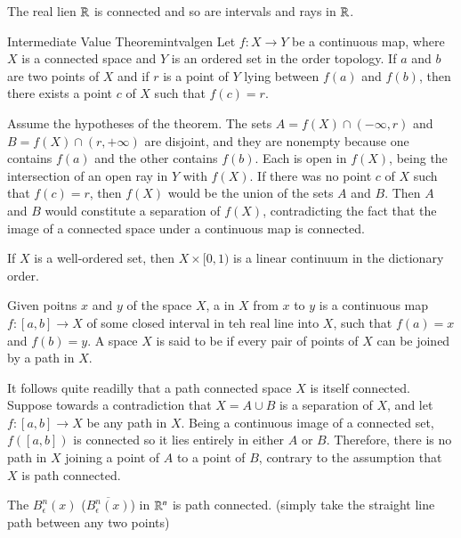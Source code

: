 \documentclass[12pt, a4paper, twoside, openright, titlepage]{book}
\begin{document}
\begin{cor}{}{}
    The real lien $\mathbb R$ is connected and so are intervals and rays in $\mathbb R$.
\end{cor}


\begin{namthm}{Intermediate Value Theorem}{intvalgen}
    Let $f:X\rightarrow Y$ be a continuous map, where $X$ is a connected space and $Y$ is an ordered set in the order topology. If $a$ and $b$ are two points of $X$ and if $r$ is a point of $Y$ lying between $f(a)$ and $f(b)$, then there exists a point $c$ of $X$ such that $f(c) = r$.
\end{namthm}
\begin{proof*}{}{}
    Assume the hypotheses of the theorem. The sets $A = f(X)\cap (-\infty, r)$ and $B = f(X)\cap(r,+\infty)$ are disjoint, and they are nonempty because one contains $f(a)$ and the other contains $f(b)$. Each is open in $f(X)$, being the intersection of an open ray in $Y$ with $f(X)$. If there was no point $c$ of $X$ such that $f(c) = r$, then $f(X)$ would be the union of the sets $A$ and $B$. Then $A$ and $B$ would constitute a separation of $f(X)$, contradicting the fact that the image of a connected space under a continuous map is connected.
\end{proof*}

\begin{eg}{}{}
    If $X$ is a well-ordered set, then $X\times [0,1)$ is a linear continuum in the dictionary order.
\end{eg}

\begin{defn}{}{}
    Given poitns $x$ and $y$ of the space $X$, a  in $X$ from $x$ to $y$ is a continuous map $f:[a,b]\rightarrow X$ of some closed interval in teh real line into $X$, such that $f(a) = x$ and $f(b) = y$. A space $X$ is said to be  if every pair of points of $X$ can be joined by a path in $X$.
\end{defn}

It follows quite readilly that a path connected space $X$ is itself connected. Suppose towards a contradiction that $X = A\cup B$ is a separation of $X$, and let $f:[a,b]\rightarrow X$ be any path in $X$. Being a continuous image of a connected set, $f([a,b])$ is connected so it lies entirely in either $A$ or $B$. Therefore, there is no path in $X$ joining a point of $A$ to a point of $B$, contrary to the assumption that $X$ is path connected.

\begin{eg}{}{}
    The  $B^n_{\epsilon}(x)$ ($\overline{B^n_{\epsilon}(x)}$) in $\mathbb R^n$ is path connected. (simply take the straight line path between any two points)
\end{eg}
\end{document}
